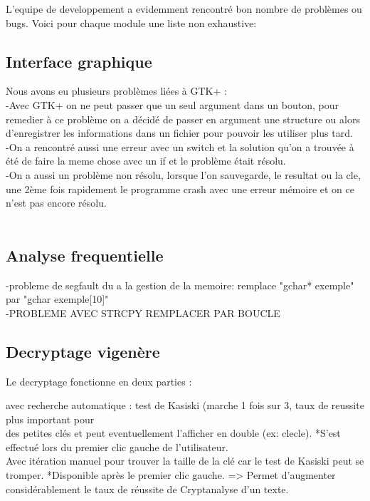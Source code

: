 \documentclass[a4]{article}
\begin{document}
	L'equipe de developpement a evidemment rencontré bon nombre de problèmes ou bugs. Voici pour chaque
	module une liste non exhaustive:
	\subsection{Interface graphique}
	Nous avons eu plusieurs problèmes liées à GTK+ :\\
	-Avec GTK+ on ne peut passer que un seul argument dans un bouton, 
	pour remedier à ce problème on a décidé de passer en argument une structure ou alors d'enregistrer les informations dans un fichier pour 
	pouvoir les utiliser plus tard.\\
	-On a rencontré aussi une erreur avec un switch et la solution qu'on a trouvée à été de faire 
	la meme chose avec un if et le problème était résolu.\\
	
	-On a aussi un problème non résolu, lorsque l'on sauvegarde, le resultat ou la cle, une 2ème fois rapidement le programme crash 
	avec une erreur mémoire et on ce n'est pas encore résolu.\\
	\\
	
	\subsection{Analyse frequentielle}
	-probleme de segfault du a la gestion de la memoire: remplace "gchar* exemple" par "gchar exemple[10]"\\
	-PROBLEME AVEC STRCPY REMPLACER PAR BOUCLE
	\subsection{Decryptage vigenère}
 		Le decryptage fonctionne en deux parties :
 		
 		avec recherche automatique : test de Kasiski (marche 1 fois sur 3, taux de reussite plus important pour \\
 		des petites clés et peut eventuellement l'afficher en double (ex: clecle). 
 		*S'est effectué lors du premier clic gauche de l'utilisateur. \\
 		
 		Avec itération manuel pour trouver la taille de la clé car le test de Kasiski peut se tromper.
 		*Disponible après le premier clic gauche.
 		=> Permet d'augmenter considérablement le taux de réussite de Cryptanalyse d'un texte. \\
  		
\end{document}

